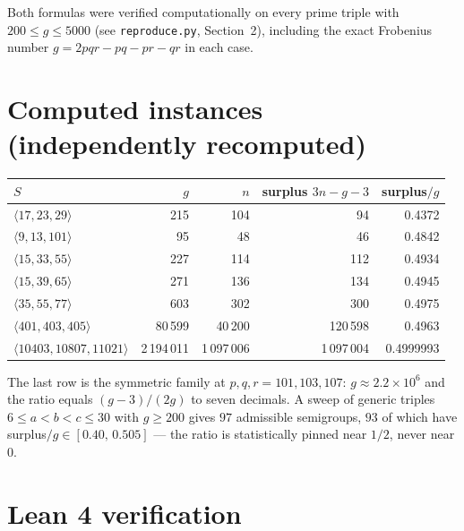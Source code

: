 \documentclass[11pt]{article}
\newcommand{\Sg}[1]{\langle #1\rangle}
\begin{document}
Both formulas were verified computationally on every prime triple with
$200 \le g \le 5000$ (see \texttt{reproduce.py}, Section~2), including the exact
Frobenius number $g = 2pqr - pq - pr - qr$ in each case.

\section{Computed instances (independently recomputed)}

\begin{center}
\small
\begin{tabular}{lrrrr}
\toprule
$S$ & $g$ & $n$ & surplus $3n-g-3$ & surplus$/g$ \\
\midrule
$\Sg{17,23,29}$ & 215 & 104 & 94 & 0.4372 \\
$\Sg{9,13,101}$ & 95 & 48 & 46 & 0.4842 \\
$\Sg{15,33,55}$ & 227 & 114 & 112 & 0.4934 \\
$\Sg{15,39,65}$ & 271 & 136 & 134 & 0.4945 \\
$\Sg{35,55,77}$ & 603 & 302 & 300 & 0.4975 \\
$\Sg{401,403,405}$ & 80\,599 & 40\,200 & 120\,598 & 0.4963 \\
$\Sg{10403,10807,11021}$ & 2\,194\,011 & 1\,097\,006 & 1\,097\,004 & 0.4999993 \\
\bottomrule
\end{tabular}
\end{center}

The last row is the symmetric family at $p,q,r = 101,103,107$: $g \approx 2.2 \times 10^6$
and the ratio equals $(g-3)/(2g)$ to seven decimals. A sweep of generic triples
$6 \le a < b < c \le 30$ with $g \ge 200$ gives $97$ admissible semigroups, $93$ of
which have surplus$/g \in [0.40,\,0.505]$ --- the ratio is statistically pinned near
$1/2$, never near $0$.

\section{Lean 4 verification}
\end{document}
